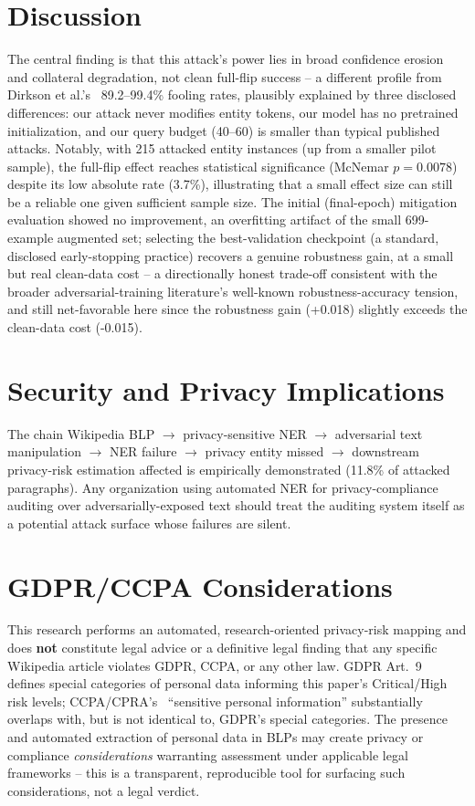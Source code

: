 \documentclass[conference]{IEEEtran}
\begin{document}
\section{Discussion}
The central finding is that this attack's power lies in broad confidence erosion and collateral degradation, not clean full-flip success -- a different profile from Dirkson et al.'s~\cite{dirkson2021breaking} 89.2--99.4\% fooling rates, plausibly explained by three disclosed differences: our attack never modifies entity tokens, our model has no pretrained initialization, and our query budget (40--60) is smaller than typical published attacks. Notably, with 215 attacked entity instances (up from a smaller pilot sample), the full-flip effect reaches statistical significance (McNemar $p=0.0078$) despite its low absolute rate (3.7\%), illustrating that a small effect size can still be a reliable one given sufficient sample size. The initial (final-epoch) mitigation evaluation showed no improvement, an overfitting artifact of the small 699-example augmented set; selecting the best-validation checkpoint (a standard, disclosed early-stopping practice) recovers a genuine robustness gain, at a small but real clean-data cost -- a directionally honest trade-off consistent with the broader adversarial-training literature's well-known robustness-accuracy tension, and still net-favorable here since the robustness gain (+0.018) slightly exceeds the clean-data cost (-0.015).

\section{Security and Privacy Implications}
The chain Wikipedia BLP $\to$ privacy-sensitive NER $\to$ adversarial text manipulation $\to$ NER failure $\to$ privacy entity missed $\to$ downstream privacy-risk estimation affected is empirically demonstrated (11.8\% of attacked paragraphs). Any organization using automated NER for privacy-compliance auditing over adversarially-exposed text should treat the auditing system itself as a potential attack surface whose failures are silent.

\section{GDPR/CCPA Considerations}
This research performs an automated, research-oriented privacy-risk mapping and does \textbf{not} constitute legal advice or a definitive legal finding that any specific Wikipedia article violates GDPR, CCPA, or any other law. GDPR Art.~9~\cite{gdpr2016} defines special categories of personal data informing this paper's Critical/High risk levels; CCPA/CPRA's~\cite{ccpa2020} ``sensitive personal information'' substantially overlaps with, but is not identical to, GDPR's special categories. The presence and automated extraction of personal data in BLPs may create privacy or compliance \emph{considerations} warranting assessment under applicable legal frameworks -- this is a transparent, reproducible tool for surfacing such considerations, not a legal verdict.
\end{document}
